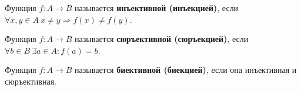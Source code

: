 Функция $f \colon A \to B$ называется \textbf{инъективной (инъекцией)}, если
$\forall x, y \in A	\ x \neq y \Rightarrow f(x) \neq f(y)$.

 Функция $f \colon A \to B$ называется \textbf{сюръективной (сюръекцией)}, если
$\forall b \in B \ \exists a \in A \colon f(a) = b$.

 Функция $f \colon A \to B$ называется \textbf{биективной (биекцией)}, если она инъективная и сюръективная.